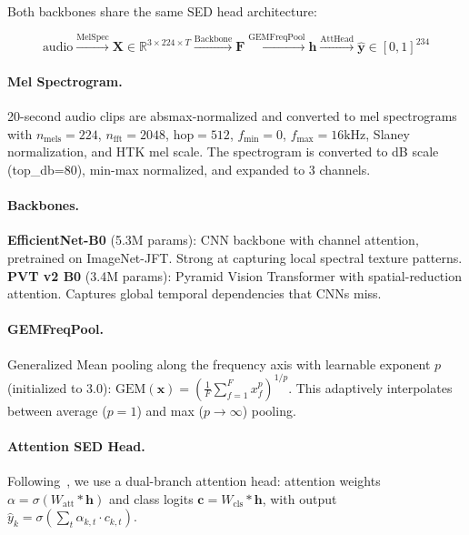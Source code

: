 \documentclass[a4paper]{article}
\begin{document}
Both backbones share the same SED head architecture:

\begin{equation}
\text{audio} \xrightarrow{\text{MelSpec}} \mathbf{X} \in \mathbb{R}^{3 \times 224 \times T}
\xrightarrow{\text{Backbone}} \mathbf{F}
\xrightarrow{\text{GEMFreqPool}} \mathbf{h}
\xrightarrow{\text{AttHead}} \hat{\mathbf{y}} \in [0,1]^{234}
\end{equation}

\paragraph{Mel Spectrogram.}
20-second audio clips are absmax-normalized and converted to mel spectrograms with $n_\text{mels}=224$, $n_\text{fft}=2048$, $\text{hop}=512$, $f_\text{min}=0$, $f_\text{max}=16\text{kHz}$, Slaney normalization, and HTK mel scale.
The spectrogram is converted to dB scale (top\_db=80), min-max normalized, and expanded to 3 channels.

\paragraph{Backbones.}
\textbf{EfficientNet-B0} (5.3M params): CNN backbone with channel attention, pretrained on ImageNet-JFT. Strong at capturing local spectral texture patterns.
\textbf{PVT v2 B0} (3.4M params): Pyramid Vision Transformer with spatial-reduction attention. Captures global temporal dependencies that CNNs miss.

\paragraph{GEMFreqPool.}
Generalized Mean pooling along the frequency axis with learnable exponent $p$ (initialized to 3.0):
$\text{GEM}(\mathbf{x}) = \left(\frac{1}{F}\sum_{f=1}^{F} x_f^p\right)^{1/p}$.
This adaptively interpolates between average ($p=1$) and max ($p \to \infty$) pooling.

\paragraph{Attention SED Head.}
Following~\citet{nam2021frequency}, we use a dual-branch attention head:
attention weights $\alpha = \sigma(W_\text{att} * \mathbf{h})$ and class logits $\mathbf{c} = W_\text{cls} * \mathbf{h}$,
with output $\hat{y}_k = \sigma\left(\sum_t \alpha_{k,t} \cdot c_{k,t}\right)$.

\end{document}
